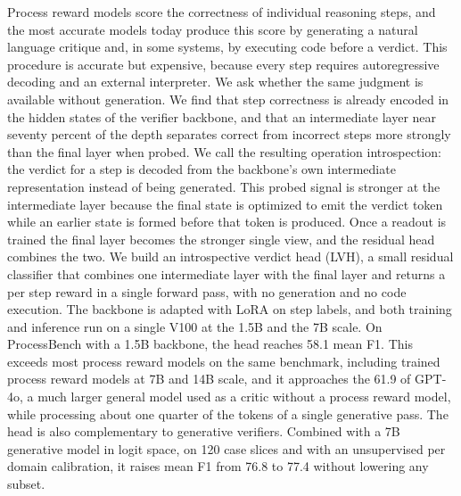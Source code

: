 
Process reward models score the correctness of individual reasoning steps, and the most accurate models today produce this score by generating a natural language critique and, in some systems, by executing code before a verdict. This procedure is accurate but expensive, because every step requires autoregressive decoding and an external interpreter. We ask whether the same judgment is available without generation. We find that step correctness is already encoded in the hidden states of the verifier backbone, and that an intermediate layer near seventy percent of the depth separates correct from incorrect steps more strongly than the final layer when probed. We call the resulting operation introspection: the verdict for a step is decoded from the backbone's own intermediate representation instead of being generated. This probed signal is stronger at the intermediate layer because the final state is optimized to emit the verdict token while an earlier state is formed before that token is produced. Once a readout is trained the final layer becomes the stronger single view, and the residual head combines the two. We build an introspective verdict head (LVH), a small residual classifier that combines one intermediate layer with the final layer and returns a per step reward in a single forward pass, with no generation and no code execution. The backbone is adapted with LoRA on step labels, and both training and inference run on a single V100 at the 1.5B and the 7B scale. On ProcessBench with a 1.5B backbone, the head reaches 58.1 mean F1. This exceeds most process reward models on the same benchmark, including trained process reward models at 7B and 14B scale, and it approaches the 61.9 of GPT-4o, a much larger general model used as a critic without a process reward model, while processing about one quarter of the tokens of a single generative pass. The head is also complementary to generative verifiers. Combined with a 7B generative model in logit space, on 120 case slices and with an unsupervised per domain calibration, it raises mean F1 from 76.8 to 77.4 without lowering any subset.
